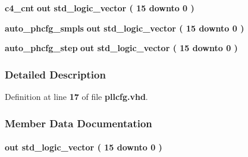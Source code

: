 \begin{DoxyCompactItemize}
{\bf c4\+\_\+cnt}  {\bfseries {\bfseries \textcolor{keywordflow}{out}\textcolor{vhdlchar}{ }}} {\bfseries \textcolor{comment}{std\+\_\+logic\+\_\+vector}\textcolor{vhdlchar}{ }\textcolor{vhdlchar}{(}\textcolor{vhdlchar}{ }\textcolor{vhdlchar}{ } \textcolor{vhdldigit}{15} \textcolor{vhdlchar}{ }\textcolor{keywordflow}{downto}\textcolor{vhdlchar}{ }\textcolor{vhdlchar}{ } \textcolor{vhdldigit}{0} \textcolor{vhdlchar}{ }\textcolor{vhdlchar}{)}\textcolor{vhdlchar}{ }} 
\item 
{\bf auto\+\_\+phcfg\+\_\+smpls}  {\bfseries {\bfseries \textcolor{keywordflow}{out}\textcolor{vhdlchar}{ }}} {\bfseries \textcolor{comment}{std\+\_\+logic\+\_\+vector}\textcolor{vhdlchar}{ }\textcolor{vhdlchar}{(}\textcolor{vhdlchar}{ }\textcolor{vhdlchar}{ } \textcolor{vhdldigit}{15} \textcolor{vhdlchar}{ }\textcolor{keywordflow}{downto}\textcolor{vhdlchar}{ }\textcolor{vhdlchar}{ } \textcolor{vhdldigit}{0} \textcolor{vhdlchar}{ }\textcolor{vhdlchar}{)}\textcolor{vhdlchar}{ }} 
\item 
{\bf auto\+\_\+phcfg\+\_\+step}  {\bfseries {\bfseries \textcolor{keywordflow}{out}\textcolor{vhdlchar}{ }}} {\bfseries \textcolor{comment}{std\+\_\+logic\+\_\+vector}\textcolor{vhdlchar}{ }\textcolor{vhdlchar}{(}\textcolor{vhdlchar}{ }\textcolor{vhdlchar}{ } \textcolor{vhdldigit}{15} \textcolor{vhdlchar}{ }\textcolor{keywordflow}{downto}\textcolor{vhdlchar}{ }\textcolor{vhdlchar}{ } \textcolor{vhdldigit}{0} \textcolor{vhdlchar}{ }\textcolor{vhdlchar}{)}\textcolor{vhdlchar}{ }} 
\end{DoxyCompactItemize}


\subsubsection{Detailed Description}


Definition at line {\bf 17} of file {\bf pllcfg.\+vhd}.



\subsubsection{Member Data Documentation}
\paragraph[{auto\+\_\+phcfg\+\_\+smpls}]{ {\bfseries \textcolor{keywordflow}{out}\textcolor{vhdlchar}{ }} {\bfseries \textcolor{comment}{std\+\_\+logic\+\_\+vector}\textcolor{vhdlchar}{ }\textcolor{vhdlchar}{(}\textcolor{vhdlchar}{ }\textcolor{vhdlchar}{ } \textcolor{vhdldigit}{15} \textcolor{vhdlchar}{ }\textcolor{keywordflow}{downto}\textcolor{vhdlchar}{ }\textcolor{vhdlchar}{ } \textcolor{vhdldigit}{0} \textcolor{vhdlchar}{ }\textcolor{vhdlchar}{)}\textcolor{vhdlchar}{ }} \hspace{0.3cm}{\ttfamily [Port]}}\label{classpllcfg_a6c6d954e1dcc63a9c67984f97e771ecb}



